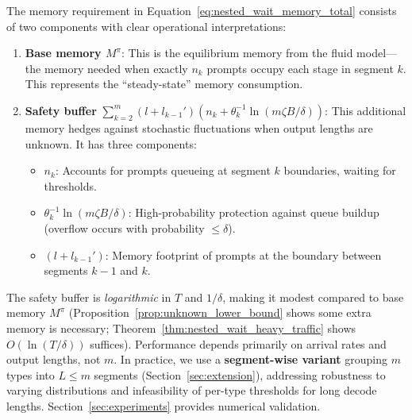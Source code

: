 The memory requirement in Equation~\eqref{eq:nested_wait_memory_total} consists of two components with clear operational interpretations:

\begin{enumerate}
    \item \textbf{Base memory $M^\pi$}: This is the equilibrium memory from the fluid model---the memory needed when exactly $n_k$ prompts occupy each stage in segment $k$. This represents the ``steady-state'' memory consumption.

    \item \textbf{Safety buffer} $\sum_{k=2}^m (l + l_{k-1}')(n_k + \theta_k^{-1}\ln(m\zeta B/\delta))$: This additional memory hedges against stochastic fluctuations when output lengths are unknown. It has three components:
    \begin{itemize}
        \item $n_k$: Accounts for prompts queueing at segment $k$ boundaries, waiting for thresholds.
        \item $\theta_k^{-1}\ln(m\zeta B/\delta)$: High-probability protection against queue buildup (overflow occurs with probability $\leq \delta$).
        \item $(l + l_{k-1}')$: Memory footprint of prompts at the boundary between segments $k-1$ and $k$.
    \end{itemize}
\end{enumerate}

The safety buffer is \emph{logarithmic} in $T$ and $1/\delta$, making it modest compared to base memory $M^\pi$ (Proposition~\ref{prop:unknown_lower_bound} shows some extra memory is necessary; Theorem~\ref{thm:nested_wait_heavy_traffic} shows $O(\ln(T/\delta))$ suffices). Performance depends primarily on arrival rates and output lengths, not $m$. In practice, we use a \textbf{segment-wise variant} grouping $m$ types into $L \leq m$ segments (Section~\ref{sec:extension}), addressing robustness to varying distributions and infeasibility of per-type thresholds for long decode lengths. Section~\ref{sec:experiments} provides numerical validation.

